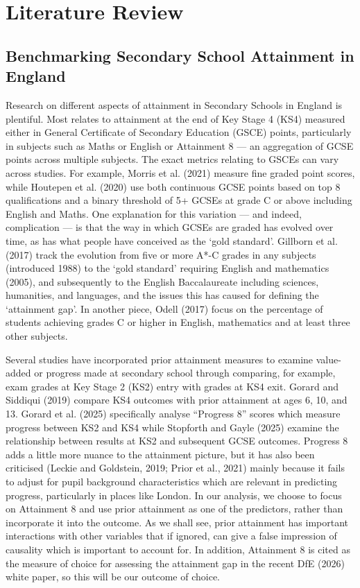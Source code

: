 \documentclass[
  11pt,
]{article}
\begin{document}
\section{Literature Review}\label{literature-review}

\subsection{Benchmarking Secondary School Attainment in
England}\label{benchmarking-secondary-school-attainment-in-england}

Research on different aspects of attainment in Secondary Schools in
England is plentiful. Most relates to attainment at the end of Key Stage
4 (KS4) measured either in General Certificate of Secondary Education
(GSCE) points, particularly in subjects such as Maths or English or
Attainment 8 --- an aggregation of GCSE points across multiple subjects.
The exact metrics relating to GSCEs can vary across studies. For
example, Morris et al. (2021) measure fine graded point scores, while
Houtepen et al. (2020) use both continuous GCSE points based on top 8
qualifications and a binary threshold of 5+ GCSEs at grade C or above
including English and Maths. One explanation for this variation --- and
indeed, complication --- is that the way in which GCSEs are graded has
evolved over time, as has what people have conceived as the `gold
standard'. Gillborn et al. (2017) track the evolution from five or more
A*-C grades in any subjects (introduced 1988) to the `gold standard'
requiring English and mathematics (2005), and subsequently to the
English Baccalaureate including sciences, humanities, and languages, and
the issues this has caused for defining the `attainment gap'. In another
piece, Odell (2017) focus on the percentage of students achieving grades
C or higher in English, mathematics and at least three other subjects.

Several studies have incorporated prior attainment measures to examine
value-added or progress made at secondary school through comparing, for
example, exam grades at Key Stage 2 (KS2) entry with grades at KS4 exit.
Gorard and Siddiqui (2019) compare KS4 outcomes with prior attainment at
ages 6, 10, and 13. Gorard et al. (2025) specifically analyse ``Progress
8'' scores which measure progress between KS2 and KS4 while Stopforth
and Gayle (2025) examine the relationship between results at KS2 and
subsequent GCSE outcomes. Progress 8 adds a little more nuance to the
attainment picture, but it has also been criticised (Leckie and
Goldstein, 2019; Prior et al., 2021) mainly because it fails to adjust
for pupil background characteristics which are relevant in predicting
progress, particularly in places like London. In our analysis, we choose
to focus on Attainment 8 and use prior attainment as one of the
predictors, rather than incorporate it into the outcome. As we shall
see, prior attainment has important interactions with other variables
that if ignored, can give a false impression of causality which is
important to account for. In addition, Attainment 8 is cited as the
measure of choice for assessing the attainment gap in the recent DfE
(2026) white paper, so this will be our outcome of choice.
\end{document}
